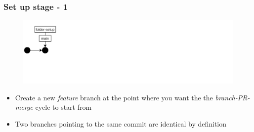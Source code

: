 \documentclass[aspectratio=169]{beamer} %
\begin{document}
\begin{frame}
	\frametitle{Set up stage - 1}

	\vspace{-.5cm}
	\begin{minipage}[t][5cm][t]{\textwidth}
		\begin{figure}
			\centering
			\includegraphics[width=\textwidth]{./img/dime-gitflow-network-1-0.png}
		\end{figure}
	\end{minipage}

	\vspace{-.5cm}
	\begin{minipage}[t][5cm][t]{\textwidth}
		\begin{itemize}
			\setlength\itemsep{.5em}
			\item Create a new \textit{feature} branch at the point where you want the the \textit{branch-PR-merge} cycle to start from
			\item Two branches pointing to the same commit are identical by definition
		\end{itemize}
	\end{minipage}

\end{frame}
\end{document}
